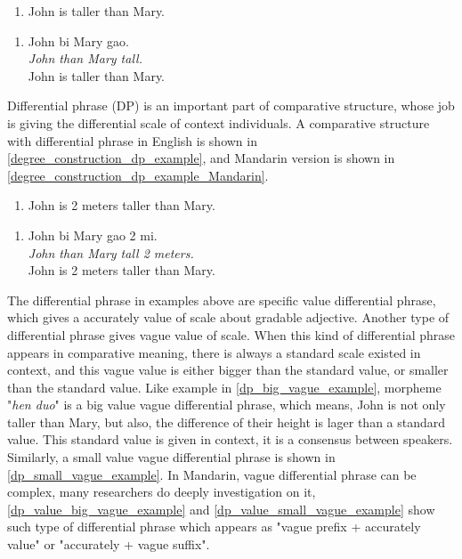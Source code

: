 \documentclass{ctexart}
\let \cite \parencite
\begin{document}
\begin{enumerate}
    \item \label{degree_construction_example}
    John is taller than Mary.
\end{enumerate}

\begin{enumerate}[resume]
    \item \label{degree_construction_example_Mandarin}
    John bi Mary gao.  \\
    \textit{John than Mary tall.} \\
    John is taller than Mary.
\end{enumerate}

Differential phrase (DP) is an important part of comparative structure, whose job is giving the differential scale of context individuals. A comparative structure with differential phrase in English is shown in \ref{degree_construction_dp_example}, and Mandarin version is shown in \ref{degree_construction_dp_example_Mandarin}.

\begin{enumerate}[resume]
    \item \label{degree_construction_dp_example}
    John is 2 meters taller than Mary.
\end{enumerate}

\begin{enumerate}[resume]
    \item \label{degree_construction_dp_example_Mandarin}
    John bi Mary gao 2 mi.  \\
    \textit{John than Mary tall 2 meters.} \\
    John is 2 meters taller than Mary.
\end{enumerate}

The differential phrase in examples above are specific value differential phrase, which gives a accurately value of scale about gradable adjective. Another type of differential phrase gives vague value of scale. When this kind of differential phrase appears in comparative meaning, there is always a standard scale existed in context, and this vague value is either bigger than the standard value, or smaller than the standard value. Like example in \ref{dp_big_vague_example}, morpheme "\textit{hen duo}" is a big value vague differential phrase, which means, John is not only taller than Mary, but also, the difference of their height is lager than a standard value. This standard value is given in context, it is a consensus between speakers. Similarly, a small value vague differential phrase is shown in \ref{dp_small_vague_example}. In Mandarin, vague differential phrase can be complex, many researchers \cite{lin2014,li2015} do deeply investigation on it, \ref{dp_value_big_vague_example} and \ref{dp_value_small_vague_example} show such type of differential phrase which appears as "vague prefix + accurately value" or "accurately + vague suffix".
\end{document}
